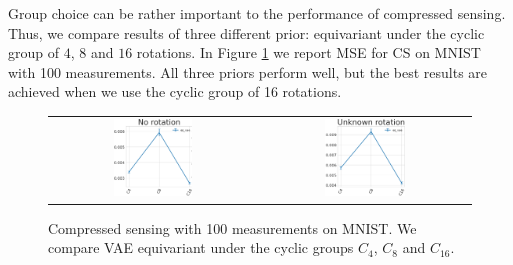 Group choice can be rather important to the performance of compressed sensing. Thus, we compare results of three different prior: equivariant under the cyclic group of $4$, $8$ and $16$ rotations. In Figure \ref{fig:vae_prior_group} we report MSE for CS on MNIST with 100 measurements. All three priors perform well, but the best results are achieved when we use the cyclic group of 16 rotations. 
\begin{figure}[h]
    \centering
    \begin{tabular}{cc}
        \includegraphics[width=0.4\textwidth]{pics/2_equiv_vae/eq_vae_group_no_rotation.png} &
        \includegraphics[width=0.4\textwidth]{pics/2_equiv_vae/eq_vae_group_rotation.png} \\
    \end{tabular}
    \caption{Compressed sensing with 100 measurements on MNIST. We compare VAE equivariant under the cyclic groups $C_4$, $C_8$ and $C_{16}$.}
    \label{fig:vae_prior_group}
\end{figure}

\newpage
